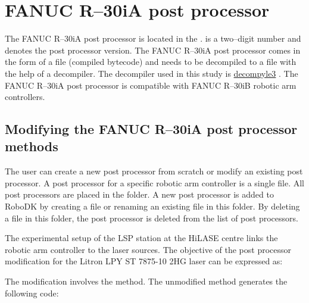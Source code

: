 \section{FANUC R--30iA post processor}

The FANUC R--30iA post processor is located in the .  is a two--digit number and denotes the post processor version. The FANUC R--30iA post processor comes in the form of a  file (compiled bytecode) and needs to be decompiled to a  file with the help of a decompiler. The decompiler used in this study is   \href{https://github.com/rocky/python--decompile3}{decompyle3} \cite{decompyle3}. The FANUC R--30iA post processor is compatible with FANUC R--30iB robotic arm controllers.

\subsection{Modifying the FANUC R--30iA post processor methods} 
\label{sec:modifying}

The user can create a new post processor from scratch or modify an existing post processor. A post processor for a specific robotic arm controller is a single  file. All post processors are placed in the  folder. A new post processor is added to RoboDK by creating a  file or renaming an existing  file in this folder. By deleting a  file in this folder, the post processor is deleted from the list of post processors. 

The experimental setup of the LSP station at the HiLASE centre links the robotic arm controller to the laser sources. The objective of the post processor modification for the Litron LPY ST 7875-10 2HG laser can be expressed as:



The modification involves the  method. The unmodified  method generates the following code:


